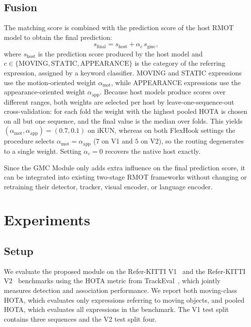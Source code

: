 \documentclass{article}
\makeatletter
\providecommand{\DIFadd}[1]{{\protect\color{blue}\uwave{#1}}} %
\providecommand{\DIFdel}[1]{{\protect\color{red}\sout{#1}}} %
\providecommand{\DIFaddbegin}{} %
\providecommand{\DIFaddend}{} %
\providecommand{\DIFdelbegin}{} %
\providecommand{\DIFdelend}{} %
\providecommand{\DIFscaledelfig}{0.5}
\newlength{\DIFdelgraphicswidth} %
\newlength{\DIFdelgraphicsheight} %
\providecommand{\DIFaddincludegraphics}[2][]{{\color{blue}\fbox{\DIFOincludegraphics[#1]{#2}}}} %
\providecommand{\DIFdelincludegraphics}[2][]{%
\sbox{\DIFdelgraphicsbox}{\DIFOincludegraphics[#1]{#2}}%
\settoboxwidth{\DIFdelgraphicswidth}{\DIFdelgraphicsbox} %
\settoboxtotalheight{\DIFdelgraphicsheight}{\DIFdelgraphicsbox} %
\scalebox{\DIFscaledelfig}{%
\parbox[b]{\DIFdelgraphicswidth}{\usebox{\DIFdelgraphicsbox}\\[-\baselineskip] \rule{\DIFdelgraphicswidth}{0em}}\llap{\resizebox{\DIFdelgraphicswidth}{\DIFdelgraphicsheight}{%
\setlength{\unitlength}{\DIFdelgraphicswidth}%
\begin{picture}(1,1)%
\thicklines\linethickness{2pt} %
{\color[rgb]{1,0,0}\put(0,0){\framebox(1,1){}}}%
{\color[rgb]{1,0,0}\put(0,0){\line( 1,1){1}}}%
{\color[rgb]{1,0,0}\put(0,1){\line(1,-1){1}}}%
\end{picture}%
}\hspace*{3pt}}} %
} %
\DeclareRobustCommand{\DIFaddbegin}{\DIFOaddbegin \let\includegraphics\DIFaddincludegraphics} %
\DeclareRobustCommand{\DIFaddend}{\DIFOaddend \let\includegraphics\DIFOincludegraphics} %
\DeclareRobustCommand{\DIFdelbegin}{\DIFOdelbegin \let\includegraphics\DIFdelincludegraphics} %
\DeclareRobustCommand{\DIFdelend}{\DIFOaddend \let\includegraphics\DIFOincludegraphics} %
\let\sout@orig\sout %
\renewcommand{\sout}[1]{\ifmmode\text{\sout@orig{\ensuremath{#1}}}\else\sout@orig{#1}\fi} %
\makeatother
\begin{document}
\subsection{Fusion}
\label{sec:fusion}
The matching score is combined with the prediction score of the host RMOT model to obtain the final prediction:
\begin{equation}
  s_{\mathrm{final}} = s_{\mathrm{host}} + \alpha_{c}\,s_{\mathrm{gmc}},
  \label{eq:fusion}
\end{equation}
where $s_{\mathrm{host}}$ is the prediction score produced by the host model and $c\in\{\mathrm{MOVING},\mathrm{STATIC},\mathrm{APPEARANCE}\}$ is the category of the referring expression, assigned by a keyword classifier. MOVING and STATIC expressions use the motion-oriented weight $\alpha_{\mathrm{mot}}$, while APPEARANCE expressions use the appearance-oriented weight $\alpha_{\mathrm{app}}$. Because host models produce scores over different ranges, both weights are selected per host by leave-one-sequence-out cross-validation: for each fold the weight with the highest pooled HOTA is chosen on all but one sequence, and the final value is the median over folds. This yields \DIFdelbegin \DIFdel{$(\alpha_{\mathrm{mot}},\alpha_{\mathrm{app}})=(0.7,0.1)$ }\DIFdelend \DIFaddbegin \DIFadd{$(\alpha_{\mathrm{mot}},\alpha_{\mathrm{app}})=(1.0,0.1)$ }\DIFaddend on iKUN, whereas on both FlexHook settings the procedure selects $\alpha_{\mathrm{mot}}=\alpha_{\mathrm{app}}$ ($7$ on V1 and $5$ on V2), so the routing degenerates to a single weight. Setting $\alpha_c=0$ recovers the native host exactly.


Since the GMC Module only adds extra influence on the final prediction score, it can be integrated into existing two-stage RMOT frameworks without changing or retraining their detector, tracker, visual encoder, or language encoder.

\section{Experiments}
\label{sec:exp}

\subsection{Setup}
\label{sec:setup}
We evaluate the proposed module on the Refer-KITTI V1~\cite{transrmot} and the Refer-KITTI V2~\cite{temprmot} benchmarks using the HOTA metric from TrackEval~\cite{hota}, which jointly measures detection and association performance. We report both moving-class HOTA, which evaluates only expressions referring to moving objects, and pooled HOTA, which evaluates all expressions in the benchmark. The V1 test split contains three sequences and the V2 test split four.
\end{document}
